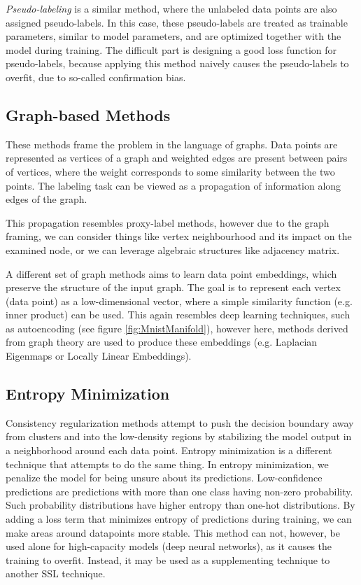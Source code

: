 \emph{Pseudo-labeling} is a similar method, where the unlabeled data points are also assigned pseudo-labels. In this case, these pseudo-labels are treated as trainable parameters, similar to model parameters, and are optimized together with the model during training. The difficult part is designing a good loss function for pseudo-labels, because applying this method naively causes the pseudo-labels to overfit, due to so-called confirmation bias.


\subsection{Graph-based Methods}

These methods frame the problem in the language of graphs. Data points are represented as vertices of a graph and weighted edges are present between pairs of vertices, where the weight corresponds to some similarity between the two points. The labeling task can be viewed as a propagation of information along edges of the graph.

This propagation resembles proxy-label methods, however due to the graph framing, we can consider things like vertex neighbourhood and its impact on the examined node, or we can leverage algebraic structures like adjacency matrix.

A different set of graph methods aims to learn data point embeddings, which preserve the structure of the input graph. The goal is to represent each vertex (data point) as a low-dimensional vector, where a simple similarity function (e.g. inner product) can be used. This again resembles deep learning techniques, such as autoencoding (see figure \ref{fig:MnistManifold}), however here, methods derived from graph theory are used to produce these embeddings (e.g. Laplacian Eigenmaps or Locally Linear Embeddings).


\subsection{Entropy Minimization}
\label{sec:EntropyMinimization}

Consistency regularization methods attempt to push the decision boundary away from clusters and into the low-density regions by stabilizing the model output in a neighborhood around each data point. Entropy minimization is a different technique that attempts to do the same thing. In entropy minimization, we penalize the model for being unsure about its predictions. Low-confidence predictions are predictions with more than one class having non-zero probability. Such probability distributions have higher entropy than one-hot distributions. By adding a loss term that minimizes entropy of predictions during training, we can make areas around datapoints more stable. This method can not, however, be used alone for high-capacity models (deep neural networks), as it causes the training to overfit. Instead, it may be used as a supplementing technique to another SSL technique.


